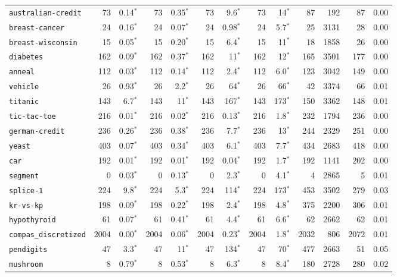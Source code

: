 \begin{tabular}{lrrrrrrrrrrrr}
\texttt{australian-credit} & 73 & 0.14$^*$ & 73 & 0.35$^*$ & 73 & 9.6$^*$ & 73 & 14$^*$ & 87 & 192 & 87 & 0.00\\
\texttt{breast-cancer} & 24 & 0.16$^*$ & 24 & 0.07$^*$ & 24 & 0.98$^*$ & 24 & 5.7$^*$ & 25 & 3131 & 28 & 0.00\\
\texttt{breast-wisconsin} & 15 & 0.05$^*$ & 15 & 0.20$^*$ & 15 & 6.4$^*$ & 15 & 11$^*$ & 18 & 1858 & 26 & 0.00\\
\texttt{diabetes} & 162 & 0.09$^*$ & 162 & 0.37$^*$ & 162 & 11$^*$ & 162 & 12$^*$ & 165 & 3501 & 177 & 0.00\\
\texttt{anneal} & 112 & 0.03$^*$ & 112 & 0.14$^*$ & 112 & 2.4$^*$ & 112 & 6.0$^*$ & 123 & 3042 & 149 & 0.00\\
\texttt{vehicle} & 26 & 0.93$^*$ & 26 & 2.2$^*$ & 26 & 64$^*$ & 26 & 66$^*$ & 42 & 3374 & 66 & 0.01\\
\texttt{titanic} & 143 & 6.7$^*$ & 143 & 11$^*$ & 143 & 167$^*$ & 143 & 173$^*$ & 150 & 3362 & 148 & 0.01\\
\texttt{tic-tac-toe} & 216 & 0.01$^*$ & 216 & 0.02$^*$ & 216 & 0.13$^*$ & 216 & 1.8$^*$ & 232 & 1794 & 236 & 0.00\\
\texttt{german-credit} & 236 & 0.26$^*$ & 236 & 0.38$^*$ & 236 & 7.7$^*$ & 236 & 13$^*$ & 244 & 2329 & 251 & 0.00\\
\texttt{yeast} & 403 & 0.07$^*$ & 403 & 0.34$^*$ & 403 & 6.1$^*$ & 403 & 7.7$^*$ & 434 & 2683 & 418 & 0.00\\
\texttt{car} & 192 & 0.01$^*$ & 192 & 0.01$^*$ & 192 & 0.04$^*$ & 192 & 1.7$^*$ & 192 & 1141 & 202 & 0.00\\
\texttt{segment} & 0 & 0.03$^*$ & 0 & 0.13$^*$ & 0 & 2.3$^*$ & 0 & 4.1$^*$ & 4 & 2865 & 5 & 0.01\\
\texttt{splice-1} & 224 & 9.8$^*$ & 224 & 5.3$^*$ & 224 & 114$^*$ & 224 & 173$^*$ & 453 & 3502 & 279 & 0.03\\
\texttt{kr-vs-kp} & 198 & 0.09$^*$ & 198 & 0.22$^*$ & 198 & 2.4$^*$ & 198 & 4.8$^*$ & 375 & 2200 & 306 & 0.01\\
\texttt{hypothyroid} & 61 & 0.07$^*$ & 61 & 0.41$^*$ & 61 & 4.4$^*$ & 61 & 6.6$^*$ & 62 & 2662 & 62 & 0.01\\
\texttt{compas\_discretized} & 2004 & 0.00$^*$ & 2004 & 0.06$^*$ & 2004 & 0.23$^*$ & 2004 & 1.8$^*$ & 2032 & 806 & 2072 & 0.01\\
\texttt{pendigits} & 47 & 3.3$^*$ & 47 & 11$^*$ & 47 & 134$^*$ & 47 & 70$^*$ & 477 & 2663 & 51 & 0.05\\
\texttt{mushroom} & 8 & 0.79$^*$ & 8 & 0.53$^*$ & 8 & 6.3$^*$ & 8 & 8.4$^*$ & 180 & 2728 & 280 & 0.02\\

\end{tabular}
